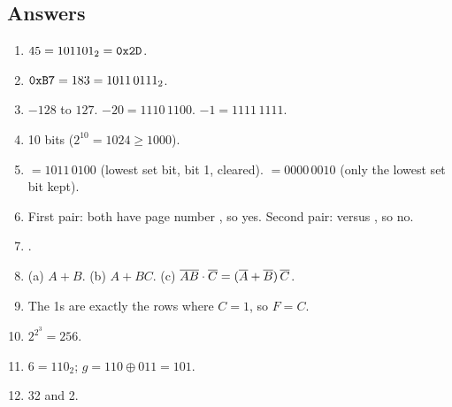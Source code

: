 \subsection*{Answers}
\begin{enumerate}
  \item $45 = 101101_2 = \texttt{0x2D}$.
  \item $\texttt{0xB7} = 183 = 1011\,0111_2$.
  \item $-128$ to $127$. $-20 = 1110\,1100$. $-1 = 1111\,1111$.
  \item 10 bits ($2^{10} = 1024 \ge 1000$).
  \item {} $= 1011\,0100$ (lowest set bit, bit 1, cleared).  $= 0000\,0010$ (only the lowest set bit kept).
  \item First pair: both have page number , so yes. Second pair:  versus , so no.
  \item {}.
  \item (a) $A + B$. (b) $A + BC$. (c) $\overline{AB}\cdot\overline{C} = (\overline{A} + \overline{B})\,\overline{C}$.
  \item The 1s are exactly the rows where $C = 1$, so $F = C$.
  \item $2^{2^3} = 256$.
  \item $6 = 110_2$; $g = 110 \oplus 011 = 101$.
  \item 32 and 2.
\end{enumerate}
